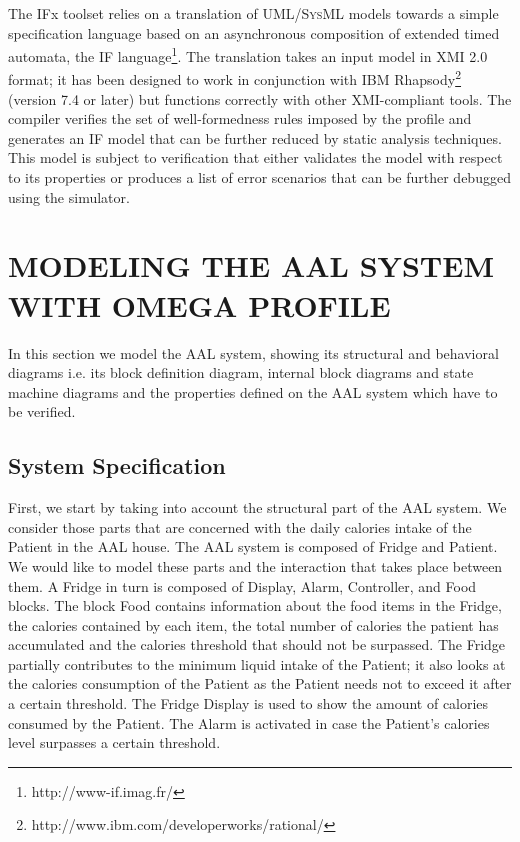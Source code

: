 \documentclass[a4paper,twoside]{article}
\def\sysml{\textsc{SysML}}
\def\uml{\textsc{UML}}
\begin{document}
The IFx toolset relies on a translation of \uml{}/\sysml{} models towards a simple specification language based on an asynchronous composition of extended timed automata, the IF language\footnote{http://www-if.imag.fr/}. The translation takes an input model in XMI 2.0 format; it has been designed to work in conjunction with IBM Rhapsody\footnote{http://www.ibm.com/developerworks/rational/} (version 7.4 or later) but functions correctly with other XMI-compliant tools. The compiler verifies the set of well-formedness rules imposed by the profile and generates an IF model that can be further reduced by static analysis techniques. This model is subject to verification that either validates the model with respect to its properties or produces a list of error scenarios that can be further debugged using the simulator.

\section{\uppercase{Modeling the AAL system with OMEGA Profile}}
\label{modeling aal system}
In this section we model the AAL system, showing its structural and behavioral diagrams i.e. its block definition diagram, internal block diagrams and state machine diagrams and the properties defined on the AAL system which have to be verified. 

\subsection{System Specification}
First, we start by taking into account the structural part of the AAL system. We consider those parts that are concerned with the daily calories intake of the Patient in the AAL house. The AAL system is composed of Fridge and Patient. We would like to model these parts and the interaction that takes place between them. A Fridge in turn is composed of Display, Alarm, Controller, and Food blocks. The block Food contains information about the food items in the Fridge, the calories contained by each item, the total number of calories the patient has accumulated and the calories threshold that should not be surpassed. The Fridge partially contributes to the minimum liquid intake of the Patient; it also looks at the calories consumption of the Patient as the Patient needs not to exceed it after a certain threshold. The Fridge Display is used to show the amount of calories consumed by the Patient. The Alarm is activated in case the Patient's calories level surpasses a certain threshold. 
\end{document}
